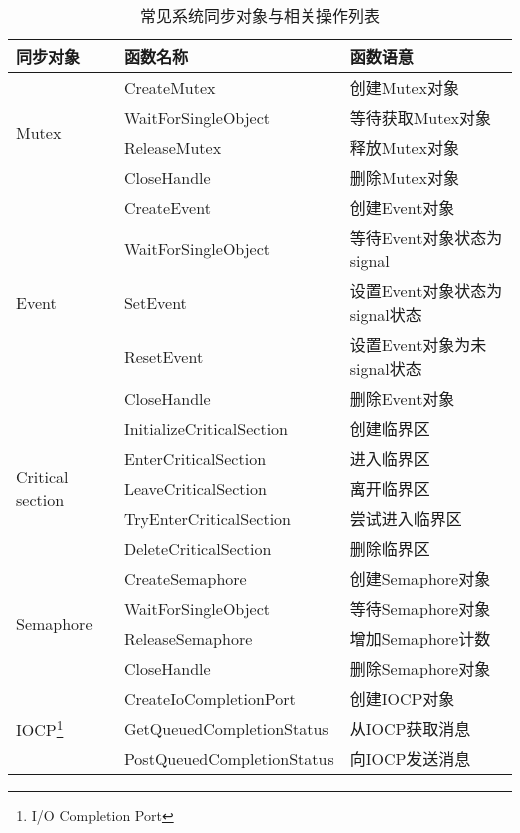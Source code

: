\begin{table}[htbp]
\centering
\begin{minipage}{0.8\linewidth}
\centering
\caption{常见系统同步对象与相关操作列表}
\label{fig:sync_func}
\begin{tabular}{lll}

\toprule[1.5pt]
同步对象 & 函数名称 & 函数语意 \\
\midrule[1pt]
\multirow{4}{*}{Mutex} & CreateMutex & 创建Mutex对象 \\
                       & WaitForSingleObject & 等待获取Mutex对象 \\
                       & ReleaseMutex & 释放Mutex对象 \\
                       & CloseHandle & 删除Mutex对象 \\
\midrule[1pt]

\multirow{5}{*}{Event} & CreateEvent & 创建Event对象 \\
                       & WaitForSingleObject & 等待Event对象状态为signal \\
                       & SetEvent & 设置Event对象状态为signal状态 \\
                       & ResetEvent & 设置Event对象为未signal状态 \\
                       & CloseHandle & 删除Event对象 \\
\midrule[1pt]

\multirow{5}{*}{Critical section} & InitializeCriticalSection & 创建临界区 \\
                                  & EnterCriticalSection & 进入临界区 \\
                                  & LeaveCriticalSection & 离开临界区 \\
                                  & TryEnterCriticalSection & 尝试进入临界区 \\
                                  & DeleteCriticalSection & 删除临界区 \\
\midrule[1pt]

\multirow{4}{*}{Semaphore} & CreateSemaphore & 创建Semaphore对象 \\
                           & WaitForSingleObject & 等待Semaphore对象 \\
                           & ReleaseSemaphore & 增加Semaphore计数 \\
                           & CloseHandle & 删除Semaphore对象 \\
\midrule[1pt]

\multirow{3}{*}{IOCP\footnote{I/O Completion Port}} & CreateIoCompletionPort & 创建IOCP对象 \\
                           & GetQueuedCompletionStatus & 从IOCP获取消息 \\
                           & PostQueuedCompletionStatus & 向IOCP发送消息\\
\midrule[1pt]


\end{tabular}
\end{minipage}
\end{table}
